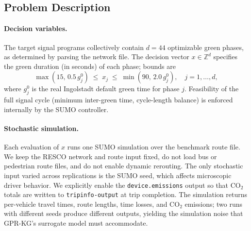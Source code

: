 \documentclass[12pt]{article}
\theoremstyle{plain}
\theoremstyle{definition}
\theoremstyle{remark}
\newcommand{\Z}{\mathbb{Z}}
\begin{document}
\subsection{Problem Description}\label{subsec:case_description}

\paragraph{Decision variables.}
The target signal programs collectively contain $d=44$ optimizable green
phases, as determined by parsing the network file.
The decision vector $x\in\Z^{d}$ specifies the green duration (in
seconds) of each phase; bounds are
\begin{equation}
  \max(15,\,0.5\,g^{0}_{j}) \;\le\; x_{j} \;\le\;
  \min(90,\,2.0\,g^{0}_{j}), \quad j=1,\dots,d,
\end{equation}
where $g^{0}_{j}$ is the real Ingolstadt default green time for phase
$j$.  Feasibility of the full signal cycle (minimum inter-green time,
cycle-length balance) is enforced internally by the SUMO controller.

\paragraph{Stochastic simulation.}
Each evaluation of $x$ runs one SUMO simulation over the benchmark
route file.  We keep the RESCO network and route input fixed, do not
load bus or pedestrian route files, and do not enable dynamic rerouting.
The only stochastic input varied across replications is the SUMO seed,
which affects microscopic driver behavior.  We explicitly enable the
\texttt{device.emissions} output so that CO$_{2}$ totals are written to
\texttt{tripinfo-output} at trip completion.  The simulation returns
per-vehicle travel times, route lengths, time losses, and CO$_{2}$
emissions; two runs with different seeds produce different outputs,
yielding the simulation noise that GPR-KG's surrogate model must
accommodate.
\end{document}
